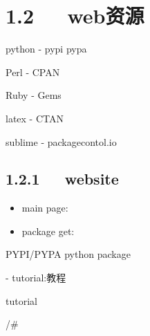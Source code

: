 \documentclass[letterpaper,12pt,english]{sphinxmanual}
\begin{document}
\begin{DUlineblock}{0em}
\item[] 
\item[] 
\item[] 
\end{DUlineblock}


\section{1.2   web资源}
\label{\detokenize{001software/001install/python:web}}
\begin{DUlineblock}{0em}
\item[] python - pypi pypa
\item[] Perl - CPAN
\item[] Ruby - Gems
\end{DUlineblock}

\begin{DUlineblock}{0em}
\item[] latex - CTAN
\item[] sublime - packagecontol.io
\end{DUlineblock}


\subsection{1.2.1   website}
\label{\detokenize{001software/001install/python:website}}\begin{itemize}
\item {} 
main page:


\item {} 
package get:

\end{itemize}

\begin{DUlineblock}{0em}
\item[] PYPI/PYPA python package
\item[] 
\item[] 
\item[] - tutorial:教程 
\item[] tutorial
\item[] 
\item[] /\#
\end{DUlineblock}
\end{document}
